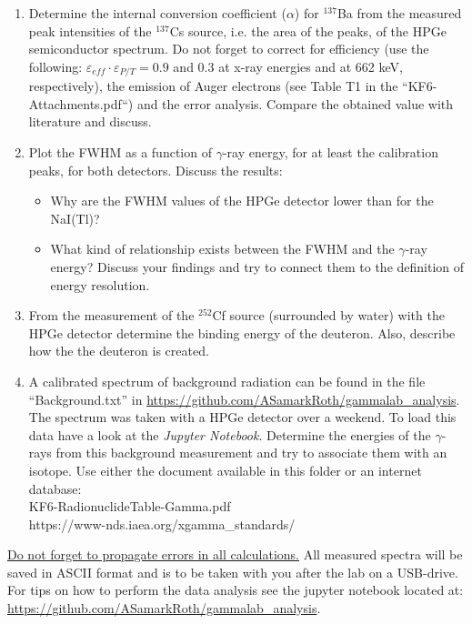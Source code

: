 \documentclass[12pt]{article}
\begin{document}
\begin{enumerate}
  \item Determine the internal conversion coefficient ($\alpha$) for $^{137}$Ba from the measured peak intensities of the $^{137}$Cs source, i.e. the area of the peaks, of the HPGe semiconductor spectrum. Do not forget to correct for efficiency (use the following: $\varepsilon_{eff} \cdot \varepsilon_{P/T} = 0.9$ and 0.3 at x-ray energies and at 662 keV, respectively), the emission of Auger electrons (see Table T1 in the ``KF6-Attachments.pdf``) and the error analysis. Compare the obtained value with literature and discuss.
  \item Plot the FWHM as a function of $\gamma$-ray energy, for at least the calibration peaks, for both detectors. Discuss the results:
    \begin{itemize}
      \item Why are the FWHM values of the HPGe detector lower than for the NaI(Tl)?
      \item What kind of relationship exists between the FWHM and the $\gamma$-ray energy? Discuss your findings and try to connect them to the definition of energy resolution.
    \end{itemize}
  \item From the measurement of the $^{252}$Cf source (surrounded by water) with the HPGe detector determine the binding energy of the deuteron. Also, describe how the the deuteron is created.
  \item A calibrated spectrum of background radiation can be found in the file ``Background.txt'' in \href{https://github.com/ASamarkRoth/gammalab\_analysis}{https://github.com/ASamarkRoth/gammalab\_analysis}. The spectrum was taken with a HPGe detector over a weekend. To load this data have a look at the {\it Jupyter Notebook}. Determine the energies of the $\gamma$-rays from this background measurement and try to associate them with an isotope. Use either the document available in this folder or an internet database: \\
    KF6-RadionuclideTable-Gamma.pdf \\
    https://www-nds.iaea.org/xgamma\_standards/
\end{enumerate}

\underline{Do not forget to propagate errors in all calculations.} All measured spectra will be saved in ASCII format and is to be taken with you after the lab on a USB-drive. For tips on how to perform the data analysis see the jupyter notebook located at: \\ \href{https://github.com/ASamarkRoth/gammalab\_analysis}{https://github.com/ASamarkRoth/gammalab\_analysis}.
\end{document}
